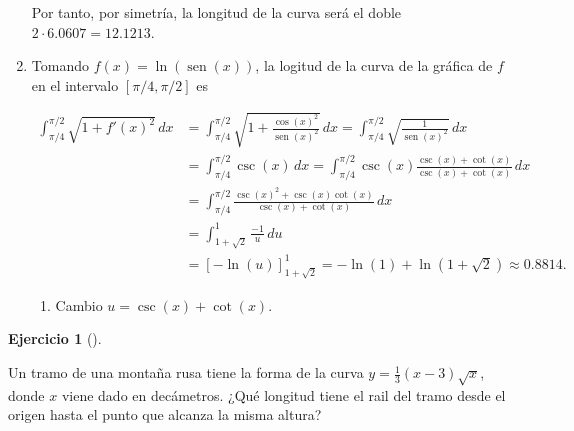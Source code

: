 \documentclass[
  a4paper,
]{scrreport}
\providecommand{\tightlist}{%
  \setlength{\itemsep}{0pt}\setlength{\parskip}{0pt}}\usepackage{longtable,booktabs,array}
\theoremstyle{definition}
\newtheorem{exercise}{Ejercicio}[chapter]
\theoremstyle{remark}
\begin{document}
\begin{tcolorbox}
\begin{enumerate}
  Por tanto, por simetría, la longitud de la curva será el doble
  \(2\cdot 6.0607 = 12.1213\).
\item
  Tomando \(f(x)=\ln(\operatorname{sen}(x))\), la logitud de la curva de
  la gráfica de \(f\) en el intervalo \([\pi/4,\pi/2]\) es

  \begin{align*}
  \int_{\pi/4}^{\pi/2} \sqrt{1+f'(x)^2}\,dx 
  &= \int_{\pi/4}^{\pi/2} \sqrt{1+\frac{\cos(x)^2}{\operatorname{sen}(x)^2}}\, dx 
  = \int_{\pi/4}^{\pi/2} \sqrt{\frac{1}{\operatorname{sen}(x)^2}}\,dx \\
  &= \int_{\pi/4}^{\pi/2} \csc(x)\,dx 
  = \int_{\pi/4}^{\pi/2} \csc(x)\frac{\csc(x)+\cot(x)}{\csc(x)+\cot(x)}\,dx \\
  &= \int_{\pi/4}^{\pi/2} \frac{\csc(x)^2+\csc(x)\cot(x)}{\csc(x)+\cot(x)}\,dx \\
  &= \int_{1+\sqrt{2}}^1 \frac{-1}{u}\,du \tag{1}\\
  &= [-\ln(u)]_{1+\sqrt{2}}^1 = -\ln(1)+\ln(1+\sqrt{2}) \approx 0.8814. 
  \end{align*}

  \begin{enumerate}
  \def\labelenumii{(\arabic{enumii})}
  \tightlist
  \item
    Cambio \(u=\csc(x)+\cot(x)\).
  \end{enumerate}
\end{enumerate}

\end{tcolorbox}

\begin{exercise}[]\protect\hypertarget{exr-longitud-montaña-rusa}{}\label{exr-longitud-montaña-rusa}

Un tramo de una montaña rusa tiene la forma de la curva
\(y=\frac{1}{3}(x-3)\sqrt{x}\), donde \(x\) viene dado en decámetros.
¿Qué longitud tiene el rail del tramo desde el origen hasta el punto que
alcanza la misma altura?

\end{exercise}
\end{document}

